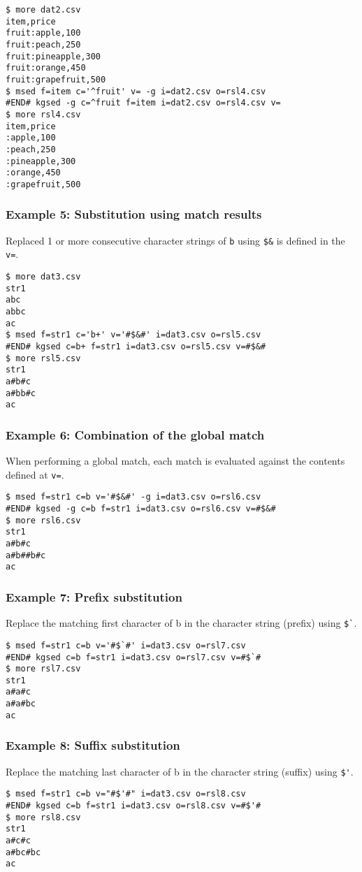 \begin{Verbatim}[baselinestretch=0.7,frame=single]
$ more dat2.csv
item,price
fruit:apple,100
fruit:peach,250
fruit:pineapple,300
fruit:orange,450
fruit:grapefruit,500
$ msed f=item c='^fruit' v= -g i=dat2.csv o=rsl4.csv
#END# kgsed -g c=^fruit f=item i=dat2.csv o=rsl4.csv v=
$ more rsl4.csv
item,price
:apple,100
:peach,250
:pineapple,300
:orange,450
:grapefruit,500
\end{Verbatim}
\subsubsection*{Example 5: Substitution using match results}

Replaced 1 or more consecutive character strings of \verb|b| using \verb|$&| is defined in the \verb|v=|.


\begin{Verbatim}[baselinestretch=0.7,frame=single]
$ more dat3.csv
str1
abc
abbc
ac
$ msed f=str1 c='b+' v='#$&#' i=dat3.csv o=rsl5.csv
#END# kgsed c=b+ f=str1 i=dat3.csv o=rsl5.csv v=#$&#
$ more rsl5.csv
str1
a#b#c
a#bb#c
ac
\end{Verbatim}
\subsubsection*{Example 6: Combination of the global match}

When performing a global match, each match is evaluated against the contents defined at \verb|v=|.


\begin{Verbatim}[baselinestretch=0.7,frame=single]
$ msed f=str1 c=b v='#$&#' -g i=dat3.csv o=rsl6.csv
#END# kgsed -g c=b f=str1 i=dat3.csv o=rsl6.csv v=#$&#
$ more rsl6.csv
str1
a#b#c
a#b##b#c
ac
\end{Verbatim}
\subsubsection*{Example 7: Prefix substitution}

Replace the matching first character of b in the character string (prefix) using \verb|$`|.


\begin{Verbatim}[baselinestretch=0.7,frame=single]
$ msed f=str1 c=b v='#$`#' i=dat3.csv o=rsl7.csv
#END# kgsed c=b f=str1 i=dat3.csv o=rsl7.csv v=#$`#
$ more rsl7.csv
str1
a#a#c
a#a#bc
ac
\end{Verbatim}
\subsubsection*{Example 8: Suffix substitution}

Replace the matching last character of b in the character string (suffix) using \verb|$'|.


\begin{Verbatim}[baselinestretch=0.7,frame=single]
$ msed f=str1 c=b v="#$'#" i=dat3.csv o=rsl8.csv
#END# kgsed c=b f=str1 i=dat3.csv o=rsl8.csv v=#$'#
$ more rsl8.csv
str1
a#c#c
a#bc#bc
ac
\end{Verbatim}
